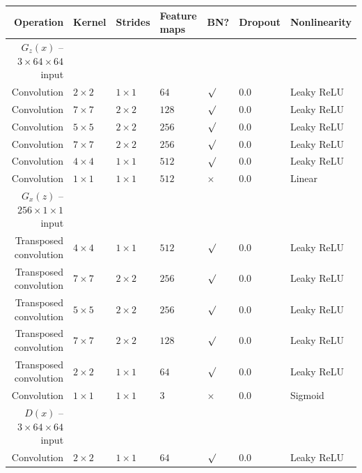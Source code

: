 \documentclass{article}
\begin{document}
\begin{table}[h]
\centering
\begin{tabular}{@{}rllllll@{}} \toprule
Operation              & Kernel       & Strides      & Feature maps & BN?          & Dropout & Nonlinearity \\ \midrule
$G_z(x)$ -- $3 \times 64 \times 64$ input                                                                 \\
Convolution            & $2 \times 2$ & $1 \times 1$ & $64$         & $\surd$      & 0.0     & Leaky ReLU \\
Convolution            & $7 \times 7$ & $2 \times 2$ & $128$        & $\surd$      & 0.0     & Leaky ReLU \\
Convolution            & $5 \times 5$ & $2 \times 2$ & $256$        & $\surd$      & 0.0     & Leaky ReLU \\
Convolution            & $7 \times 7$ & $2 \times 2$ & $256$        & $\surd$      & 0.0     & Leaky ReLU \\
Convolution            & $4 \times 4$ & $1 \times 1$ & $512$        & $\surd$      & 0.0     & Leaky ReLU \\
Convolution            & $1 \times 1$ & $1 \times 1$ & $512$        & $\times$     & 0.0     & Linear     \\
$G_x(z)$ -- $256 \times 1 \times 1$ input                                                                 \\
Transposed convolution & $4 \times 4$ & $1 \times 1$ & $512$        & $\surd$      & 0.0     & Leaky ReLU \\
Transposed convolution & $7 \times 7$ & $2 \times 2$ & $256$        & $\surd$      & 0.0     & Leaky ReLU \\
Transposed convolution & $5 \times 5$ & $2 \times 2$ & $256$         & $\surd$      & 0.0     & Leaky ReLU \\
Transposed convolution & $7 \times 7$ & $2 \times 2$ & $128$         & $\surd$      & 0.0     & Leaky ReLU \\
Transposed convolution & $2 \times 2$ & $1 \times 1$ & $64$         & $\surd$      & 0.0     & Leaky ReLU \\
Convolution            & $1 \times 1$ & $1 \times 1$ & $3$          & $\times$     & 0.0     & Sigmoid    \\
$D(x)$ -- $3 \times 64 \times 64$ input                                                                   \\
Convolution            & $2 \times 2$ & $1 \times 1$ & $64$         & $\surd$      & 0.0     & Leaky ReLU \\

\end{tabular}
\end{table}
\end{document}
